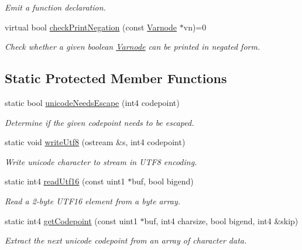 \begin{DoxyCompactItemize}
\begin{DoxyCompactList}\small\item\em Emit a function declaration. \end{DoxyCompactList}\item 
virtual bool \mbox{\hyperlink{class_print_language_a5ce2d6fc0fee85cdc030732d3825b154}{check\+Print\+Negation}} (const \mbox{\hyperlink{class_varnode}{Varnode}} $\ast$vn)=0
\begin{DoxyCompactList}\small\item\em Check whether a given boolean \mbox{\hyperlink{class_varnode}{Varnode}} can be printed in negated form. \end{DoxyCompactList}\end{DoxyCompactItemize}
\subsection*{Static Protected Member Functions}
\begin{DoxyCompactItemize}
\item 
static bool \mbox{\hyperlink{class_print_language_a4438c48a32bb84170fe5736e4f13267b}{unicode\+Needs\+Escape}} (int4 codepoint)
\begin{DoxyCompactList}\small\item\em Determine if the given codepoint needs to be escaped. \end{DoxyCompactList}\item 
static void \mbox{\hyperlink{class_print_language_af6dd42fe3c5f9941b50b06c0dfeda80c}{write\+Utf8}} (ostream \&s, int4 codepoint)
\begin{DoxyCompactList}\small\item\em Write unicode character to stream in U\+T\+F8 encoding. \end{DoxyCompactList}\item 
static int4 \mbox{\hyperlink{class_print_language_a787cce79247f1e1df842aeb7de8fb7f2}{read\+Utf16}} (const uint1 $\ast$buf, bool bigend)
\begin{DoxyCompactList}\small\item\em Read a 2-\/byte U\+T\+F16 element from a byte array. \end{DoxyCompactList}\item 
static int4 \mbox{\hyperlink{class_print_language_a65d1b23870f188666f78341d474c4fe1}{get\+Codepoint}} (const uint1 $\ast$buf, int4 charsize, bool bigend, int4 \&skip)
\begin{DoxyCompactList}\small\item\em Extract the next {\itshape unicode} {\itshape codepoint} from an array of character data. \end{DoxyCompactList}\end{DoxyCompactItemize}
